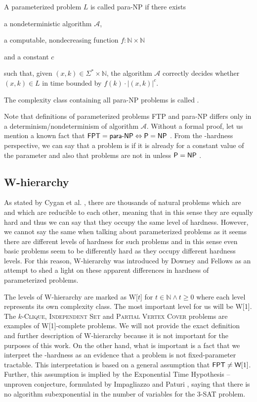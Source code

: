 \begin{definition}[para-NP]
    A parameterized problem $L$ is called para-NP if there exists
    \begin{description}
        \item a nondeterministic algorithm $\mathcal{A}$,
        \item a computable, nondecreasing function $f : \mathbb{N} \times \mathbb{N}$
        \item and a constant $c$
    \end{description}
    such that, given $(x,k) \in \Sigma^* \times \mathbb{N}$,
    the algorithm $\mathcal{A}$ correctly decides whether $(x, k) \in L$ in time bounded by
    $f(k) \cdot |(x,k)|^c$.
\end{definition}
The complexity class containing all para-NP problems is called \pNP.

Note that definitions of parameterized problems FTP and para-NP differs only in a determinism/nondeterminism of
algorithm $\mathcal{A}$.
Without a formal proof, let us mention a known fact that $\textsf{FPT} = \textsf{para-NP} \Leftrightarrow \textsf{P} = \textsf{NP}$ \cite[p.~39]{Flum2006}.
From the \pNP-hardness perspective, we can say that a problem is \pNPh if it is \NPh already for a constant value of the parameter
and also that \pNPh problems are not in \XP unless $\textsf{P} = \textsf{NP}$ \cite[p.~41]{Flum2006}. 


\subsection{W-hierarchy}

As stated by Cygan et al. \cite[p.~423]{Cygan2015},
there are thousands of natural problems which are \NPc and which are reducible to each other,
meaning that in this sense they are equally hard and thus we can say that
they occupy the same level of hardness.
However, we cannot say the same when talking about parameterized problems as it seems there are
different levels of hardness for such problems and in this sense even basic problems
seem to be differently hard as they occupy different hardness levels.
For this reason, W-hierarchy was introduced by Downey and Fellows \cite{Downey2002} as
an attempt to shed a light on these apparent differences in hardness of parameterized problems. 

The levels of W-hierarchy are marked as W[$t$] for $t \in \mathbb{N} \wedge t \geq 0$
where each level represents its own complexity class.
The most important level for us will be W[1].
The $k$-\textsc{Clique}, \textsc{Independent Set} and \textsc{Partial Vertex Cover} problems
are examples of W[1]-complete problems.
We will not provide the exact definition and further description of W-hierarchy
because it is not important for the purposes of this work.
On the other hand, what is important is a fact that we interpret the \W-hardness as an evidence that
a problem is not fixed-parameter tractable.
This interpretation is based on a general assumption that $\textsf{FPT} \neq \textsf{W}[1]$.
Further, this assumption is implied by the Exponential Time Hypothesis -- unproven conjecture,
formulated by Impagliazzo and Paturi \cite{Impagliazzo1999}, saying that there is no
algorithm subexponential in the number of variables for the $3$-\textsc{SAT} problem.
